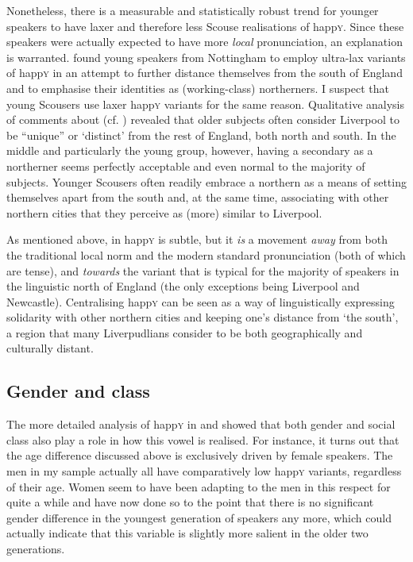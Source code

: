 Nonetheless, there is a measurable and statistically robust trend for younger speakers to have laxer and therefore less Scouse realisations of happ\textsc{y}.
Since these speakers were actually expected to have more \emph{local} pronunciation, an explanation is warranted.
\textcite{flynn2010} found young speakers from Nottingham to employ ultra-lax variants of happ\textsc{y} in an attempt to further distance themselves from the south of England and to emphasise their identities as (working-class) northerners.
I suspect that young Scousers use laxer happ\textsc{y} variants for the same reason.
Qualitative analysis of comments about  (cf. ) revealed that older subjects often consider Liverpool to be ``unique'' or `distinct' from the rest of England, both north and south.
In the middle and particularly the young group, however, having a secondary  as a northerner seems perfectly acceptable and even normal to the majority of subjects.
Younger Scousers often readily embrace a northern  as a means of setting themselves apart from the south and, at the same time, associating with other northern cities that they perceive as (more) similar to Liverpool.

As mentioned above,  in happ\textsc{y} is subtle, but it \emph{is} a movement \emph{away} from both the traditional local norm and the modern standard pronunciation (both of which are tense), and \emph{towards} the variant that is typical for the majority of speakers in the linguistic north of England (the only exceptions being Liverpool and Newcastle).
Centralising happ\textsc{y} can be seen as a way of linguistically expressing solidarity with other northern cities and keeping one's distance from `the south', a region that many Liverpudlians consider to be both geographically and culturally distant.

\subsection{Gender and class}
\label{prod.disc.happy.social}

The more detailed analysis of happ\textsc{y} in  and  showed that both gender and social class also play a role in how this vowel is realised.
For instance, it turns out that the age difference discussed above is exclusively driven by female speakers.
The men in my sample actually all have comparatively low happ\textsc{y} variants, regardless of their age.
Women seem to have been adapting to the men in this respect for quite a while and have now done so to the point that there is no significant gender difference in the youngest generation of speakers any more, which could actually indicate that this variable is slightly more salient in the older two generations.

